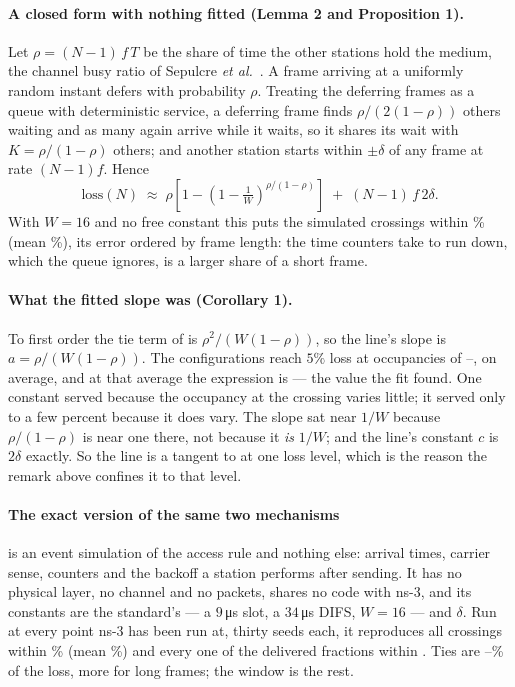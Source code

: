 \paragraph{A closed form with nothing fitted (Lemma 2 and Proposition 1).} Let
$\rho = (N-1)\,f\,T$ be the share of time the other stations hold the medium, the channel busy
ratio of Sepulcre \emph{et al.}~\cite{sepulcre2022analytical}. A frame arriving at a uniformly
random instant defers with probability $\rho$. Treating the
deferring frames as a queue with deterministic service, a deferring frame finds
$\rho/(2(1-\rho))$ others waiting and as many again arrive while it waits, so it shares its
wait with $K = \rho/(1-\rho)$ others; and another station starts within $\pm\delta$ of any
frame at rate $(N-1)f$. Hence
\begin{equation}
\text{loss}(N) \;\approx\; \rho\left[1 - \left(1 - \tfrac{1}{W}\right)^{\rho/(1-\rho)}\right]
\;+\; (N-1)\,f\,2\delta .
\label{eq:why}
\end{equation}
With $W = 16$ and no free constant this puts the \modelCells{} simulated crossings within
\closedWorst\% (mean \closedMean\%), its error ordered by frame length: the time counters take to run down, which the queue
ignores, is a larger share of a short frame.

\paragraph{What the fitted slope was (Corollary 1).} To first order the tie term of  is
$\rho^2/(W(1-\rho))$, so the line's slope is $a = \rho/(W(1-\rho))$. The configurations reach
$5\%$ loss at occupancies of \modelRhoLo--\modelRhoHi, \modelRho{} on average, and at that
average the expression is \modelSlope{} --- the value the fit found. One constant served
because the occupancy at the crossing varies little; it served only to a few percent because it
does vary. The slope sat near $1/W$ because $\rho/(1-\rho)$ is near one there, not because it
\emph{is} $1/W$; and the line's constant $c$ is $2\delta$ exactly. So the line is a tangent to
 at one loss level, which is the reason the remark above confines it to that
level.

\paragraph{The exact version of the same two mechanisms} is an event simulation of the access
rule and nothing else: arrival times, carrier sense, counters and the backoff a station performs
after sending. It has no physical layer, no channel and no packets, shares no code with ns-3,
and its constants are the standard's --- a $9$\,\si{\micro\second} slot, a
$34$\,\si{\micro\second} DIFS, $W = 16$ --- and $\delta$. Run at every point ns-3 has been run
at, thirty seeds each, it reproduces all \modelCells{} crossings within \modelWorst\% (mean
\modelMean\%) and every one of the \modelPoints{} delivered fractions within \modelMaxDiff.
Ties are \modelTieLo--\modelTieHi\% of the loss, more for long frames; the window is the rest.

